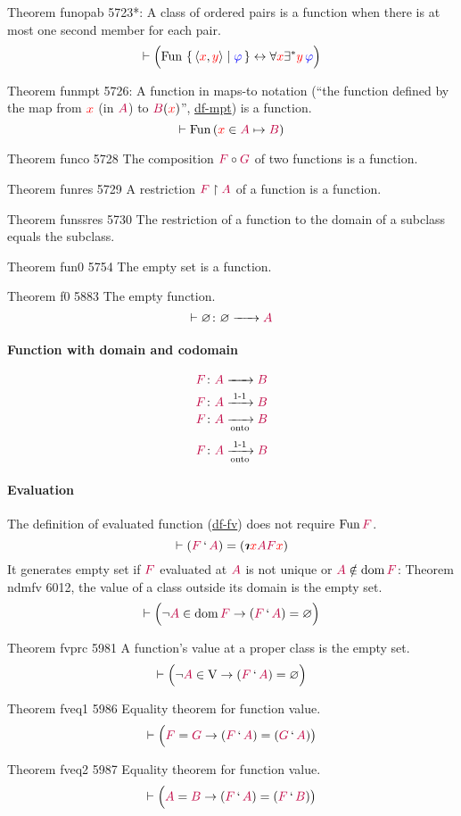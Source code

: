 \documentclass[12pt, letterpaper]{article}
\newcommand{\red}[1]{{\color{red} #1}}
\newcommand{\blue}[1]{{\color{blue} #1}}
\newcommand{\purple}[1]{{\color{purple} #1}}
\renewcommand{\emptyset}{\varnothing}
\newcommand{\provable}{\vdash}
\newcommand{\ra}{\rightarrow}
\newcommand{\lra}{\leftrightarrow}
\newcommand{\setvar}{\red}
\newcommand{\wff}{\blue}
\newcommand{\classvar}{\purple}
\newcommand{\wffphi}{\wff{\varphi}}
\newcommand{\sx}{\setvar{x}}
\newcommand{\sy}{\setvar{y}}
\newcommand{\clA}{\classvar{A}}
\newcommand{\clB}{\classvar{B}}
\newcommand{\clF}{\classvar{F}}
\newcommand{\clG}{\classvar{G}}
\newcommand{\VV}{\mathrm{V}}
\newcommand{\unique}{\exists^*}
\newcommand{\rotiota}[2]{\rotatebox[origin=c]{180}{$#1\boldsymbol{\iota}$}}
\newcommand{\iiota}{{\mathpalette\rotiota\relax}}
\newcommand{\defdes}{\iiota}
\newcommand{\Fun}{{\operatorname{Fun}\,}}
\newcommand{\at}{\,`\,}
\newcommand{\mapinto}[3]{{#1}\colon{#2}\xrightarrow[]{\mathmakebox[1.5em]{}}{#3}}
\newcommand{\injmapinto}[3]{{#1}\colon{#2}\xrightarrow[]{\mathmakebox[1.5em]{\text{1-1}}}{#3}}
\newcommand{\maponto}[3]{{#1}\colon{#2}\xrightarrow[\text{onto}]{\mathmakebox[1.5em]{}}{#3}}
\newcommand{\bijmaponto}[3]{{#1}\colon{#2}\xrightarrow[\text{onto}]{\mathmakebox[1.5em]{\text{1-1}}}{#3}}
\newcommand{\dom}{{\operatorname{dom}\,}}
\newcommand{\opair}[2]{\left\langle{{#1},{#2}}\right\rangle}
\theoremstyle{definition}
\theoremstyle{remark}
\theoremstyle{definition}
\theoremstyle{plain}
\begin{document}
	Theorem funopab 5723*: A class of ordered pairs is a function when there is at most one second member for each pair.
	\[\provable \Big(\Fun\set{\opair{\sx}{\sy}|\wffphi}\lra\forall\sx\unique\sy\,\wffphi\Big)\]
	
	Theorem funmpt 5726: A function in maps-to notation (``the function defined by the map from $\sx$ (in $\clA$) to $\clB(\sx)$'',
	\href{http://us.metamath.org/mpeuni/df-mpt.html}{df-mpt})
	is a function.
	\[\provable\Fun(\sx\in\clA\mapsto\clB) \]
	
	Theorem	funco 5728	The composition $\clF\circ\clG$ of two functions is a function.
	
	Theorem	funres 5729	A restriction $\clF\restriction\clA$ of a function is a function. 
	
	Theorem	funssres 5730	The restriction of a function to the domain of a subclass equals the subclass.
	
	Theorem	fun0 5754	The empty set is a function. 
	
	Theorem	f0 5883	The empty function.
	\[\provable\mapinto{\emptyset}{\emptyset}{\clA} \]

	\paragraph{Function with domain and codomain}
	\[\mapinto{\clF}{\clA}{\clB} \]
	\[\injmapinto{\clF}{\clA}{\clB} \]
	\[\maponto{\clF}{\clA}{\clB} \]
	\[\bijmaponto{\clF}{\clA}{\clB} \]

	\paragraph{Evaluation}
	The definition of evaluated function
	(\href{http://us.metamath.org/mpeuni/df-fv.html}{df-fv}) does not require $\Fun\clF$.
	\[\provable (\clF\at\clA) = (\defdes\sx\clA\clF\sx)\]
	It generates empty set if $\clF$ evaluated at $\clA$ is not unique or 
	$\clA\notin\dom\clF$:
	Theorem	ndmfv 6012, the value of a class outside its domain is the empty set.
	\[\provable\Big( \neg \clA\in\dom\clF\ra(\clF\at\clA)=\emptyset\Big) \]
	
	Theorem	fvprc 5981	A function's value at a proper class is the empty set. 
	\[\provable\Big(\neg\clA\in\VV \ra (\clF\at\clA)=\emptyset\Big)
	\]
	
	Theorem	fveq1 5986	Equality theorem for function value.
	\[\provable\Big(\clF=\clG\ra(\clF\at\clA)=(\clG\at\clA)
	\big) \]
	
	Theorem	fveq2 5987	Equality theorem for function value.
	\[\provable\Big(\clA=\clB\ra(\clF\at\clA)=(\clF\at\clB)
	\big) \]	
	
\end{document}
